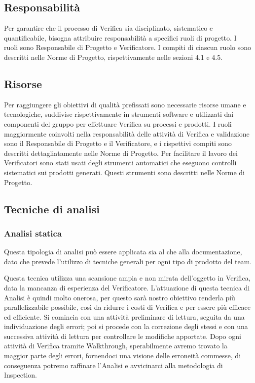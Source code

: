 \subsection{Responsabilità} %
\label{2.6}
Per garantire che il processo di Verifica sia disciplinato, sistematico e quantificabile, bisogna attribuire responsabilità a specifici ruoli di progetto. I ruoli sono Responsabile di Progetto e Verificatore. I compiti di ciascun ruolo sono descritti nelle Norme di Progetto, rispettivamente nelle sezioni 4.1 e 4.5.

\subsection{Risorse} %
\label{2.7}
Per raggiungere gli obiettivi di qualità prefissati sono necessarie risorse umane e tecnologiche, suddivise rispettivamente in strumenti software e  utilizzati dai componenti del gruppo per effettuare Verifica su processi e prodotti. I ruoli maggiormente coinvolti nella responsabilità delle attività di Verifica e validazione sono il Responsabile di Progetto e il Verificatore, e i rispettivi compiti sono descritti dettagliatamente nelle Norme di Progetto. Per facilitare il lavoro dei Verificatori sono stati usati degli strumenti automatici che eseguono controlli sistematici sui prodotti generati. Questi strumenti sono descritti nelle Norme di Progetto.

\subsection{Tecniche di analisi} %
\label{2.8}

\subsubsection{Analisi statica}
\label{3.1}
Questa tipologia di analisi può essere applicata sia al  che alla documentazione, dato che prevede l'utilizzo di tecniche generali per ogni tipo di prodotto del team.


Questa tecnica utilizza una scansione ampia e non mirata dell'oggetto in Verifica, data la mancanza di esperienza  del Verificatore.
L'attuazione di questa tecnica di Analisi è quindi molto onerosa, per questo sarà nostro obiettivo renderla più parallelizzabile possibile, così da ridurre i costi di Verifica e per essere più efficace ed efficiente.
Si comincia con una attività preliminare di lettura, seguita da una individuazione degli errori; poi si procede con la correzione degli stessi e con una successiva attività di lettura per controllare le modifiche apportate.
Dopo ogni attività di Verifica tramite Walkthrough, sperabilmente avremo trovato la maggior parte degli errori, fornendoci una visione delle erroneità commesse, di conseguenza potremo raffinare l'Analisi e avvicinarci alla metodologia di Inspection.

